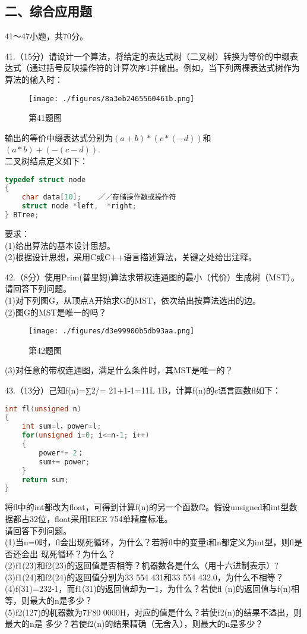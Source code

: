 \subsection{二、综合应用题}
41～47小题，共70分。

41.（15分）请设计一个算法，将给定的表达式树（二叉树）转换为等价的中缀表达式（通过括号反映操作符的计算次序1并输出。例如，当下列两棵表达式树作为算法的输入时：
\begin{figure}[ht]
\centering
\texttt{[image: ./figures/8a3eb2465560461b.png]}
\caption{第41题图} \label{fig_CSN17_4}
\end{figure}
输出的等价中缀表达式分别为$(a+b)*(c*(-d))$和$(a*b)+(-(c-d))$. \\
二叉树结点定义如下：
\begin{lstlisting}[language=cpp]
typedef struct node
{
    char data[10];    ／／存储操作数或操作符
    struct node *left,  *right;
} BTree;
\end{lstlisting}
要求： \\
(1)给出算法的基本设计思想。 \\
(2)根据设计思想，采用C或C++语言描述算法，关键之处给出注释。

42.（8分）使用Prim(普里姆)算法求带权连通图的最小（代价）生成树（MST）。请回答下列问题。 \\
(1)对下列图G，从顶点A开始求G的MST，依次给出按算法选出的边。 \\
(2)图G的MST是唯一的吗？
\begin{figure}[ht]
\centering
\texttt{[image: ./figures/d3e99900b5db93aa.png]}
\caption{第42题图} \label{fig_CSN17_5}
\end{figure}
(3)对任意的带权连通图，满足什么条件时，其MST是唯一的？

43.（13分）己知f(n)=∑2/= 21+1-1=11L 1B，计算f(n)的c语言函数fl如下： \\
\begin{lstlisting}[language=cpp]
int fl(unsigned n)
{
    int sum=l，power=l;
    for(unsigned i=0; i<=n-1; i++)
    {
        power*= 2；
        sum+= power;
    }
    return sum;
}
\end{lstlisting}
将fl中的int都改为float，可得到计算f(n)的另一个函数f2。假设unsigned和int型数据都占32位，float采用IEEE 754单精度标准。 \\
请回答下列问题。 \\
    (1)当n=0时，fl会出现死循环，为什么？若将fl中的变量i和n都定义为int型，则fl是否还会出
现死循环？为什么？ \\
    (2)f1(23)和f2(23)的返回值是否相等？机器数各是什么（用十六进制表示）? \\
    (3)f1(24)和f2(24)的返回值分别为33 554 431和33 554 432.0，为什么不相等？ \\
    (4)f(31)=232-1，而f1(31)的返回值却为一1，为什么？若使fl (n)的返回值与f(n)相等，则最大的n是多少？ \\
    (5)f2(127)的杌器数为7F80 0000H，对应的值是什么？若使f2(n)的结果不溢出，则最大的n是
多少？若使f2(n)的结果精确（无舍入），则最大的n是多少？

